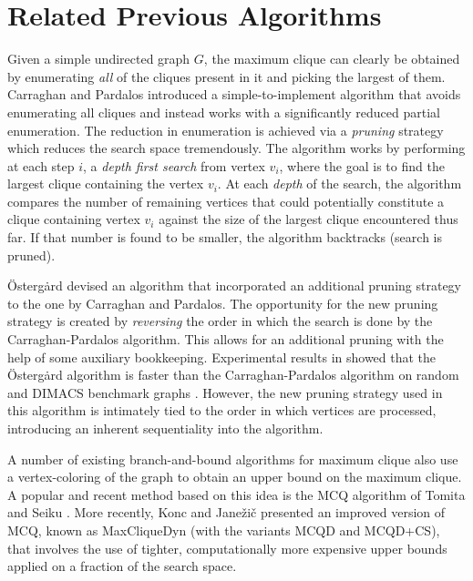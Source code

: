 \section{Related Previous Algorithms}
\label{sec:relatedwork}

Given a simple undirected graph $G$, the maximum clique can clearly be obtained by enumerating 
{\em all} of the cliques present in it and picking the largest of them.
Carraghan and Pardalos \cite{pardalos} introduced a simple-to-implement
algorithm that avoids enumerating all cliques and instead
works with a significantly reduced partial enumeration.
The reduction in enumeration is achieved via 
a {\em pruning} strategy which reduces the search space tremendously.
The algorithm works by
performing at each step $i$, a {\em depth first search} from vertex $v_i$, 
where the goal is to find the largest clique containing the vertex $v_i$.
At each {\em depth} of the search, the algorithm compares the number of remaining
vertices that could potentially constitute a clique containing vertex $v_i$
against the size of the largest clique encountered thus far.
If that number is found to be smaller, the algorithm backtracks (search is pruned).

\"{O}sterg\.{a}rd \cite{ostergard} devised an algorithm that incorporated an additional 
pruning strategy to the one by Carraghan and Pardalos.
The opportunity for the new pruning strategy is created by {\em reversing} the order in which the search is done by
the Carraghan-Pardalos algorithm. This allows for an additional pruning with the help of
some auxiliary bookkeeping. 
Experimental results in \cite{ostergard} showed that the \"{O}sterg\.{a}rd
algorithm is faster than the Carraghan-Pardalos algorithm on random and 
DIMACS benchmark graphs \cite{dimacs}.
However, the new pruning strategy used in this algorithm is intimately tied to the order in which vertices are processed, introducing an inherent sequentiality into the algorithm.

A number of existing branch-and-bound algorithms for maximum clique
also use a vertex-coloring of the graph to obtain an upper bound on the maximum clique. 
A popular and recent method based on this idea is 
the MCQ algorithm of Tomita and Seiku \cite{citeulike:7905505}. 
More recently, Konc and Jane\v{z}i\v{c} \cite{konc2007improved} presented 
an improved version of MCQ, known as MaxCliqueDyn (with the variants MCQD and MCQD+CS), 
that involves the use of tighter, computationally more expensive upper bounds 
applied on a fraction of the search space.


